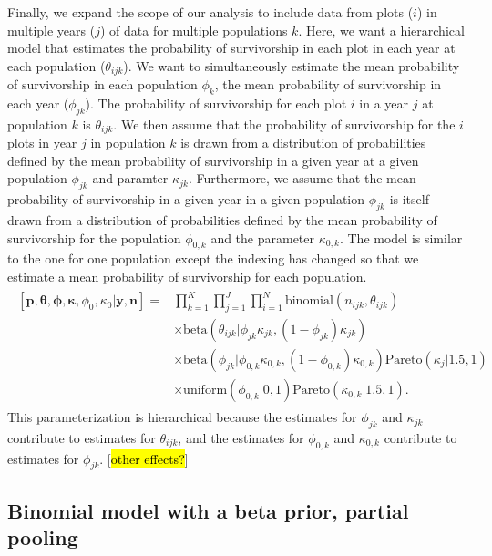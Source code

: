 \documentclass[12pt, oneside, titlepage]{article}   	%
\begin{document}
Finally, we expand the scope of our analysis to include data from plots ($i$) in multiple years ($j$) of data for multiple populations $k$. Here, we want a hierarchical model that estimates the probability of survivorship in each plot in each year at each population ($\theta_{ijk}$). We want to simultaneously estimate the mean probability of survivorship in each population $\phi_k$, the mean probability of survivorship in each year ($\phi_{jk}$). The probability of survivorship for each plot $i$ in a year $j$ at population $k$ is $\theta_{ijk}$. We then assume that the probability of survivorship for the $i$ plots in year $j$ in population $k$ is drawn from a distribution of probabilities defined by the mean probability of survivorship in a given year at a given population $\phi_{jk}$ and paramter $\kappa_{jk}$. Furthermore, we assume that the mean probability of survivorship in a given year in a given population $\phi_{jk}$ is itself drawn from a distribution of probabilities defined by the mean probability of survivorship for the population $\phi_{0,k}$ and the parameter $\kappa_{0,k}$. The model is similar to the one for one population except the indexing has changed so that we estimate a mean probability of survivorship for each population.
%
\begin{align}
  \begin{split}
[\bm{p},\bm{\theta},\bm{\phi},\bm{\kappa},\phi_0,\kappa_0|\bm{y},\bm{n}]  = & \prod_{k=1}^K\prod_{j=1}^J\prod_{i=1}^N \mathrm{binomial}(n_{ijk},\theta_{ijk}) 
    \\ & \times \mathrm{beta} (  \theta_{ijk} | \phi_{jk} \kappa_{jk} , (1-\phi_{jk}) \kappa_{jk} ) 
    \\ & \times \mathrm{beta} (  \phi_{jk} | \phi_{0,k} \kappa_{0,k} , (1- \phi_{0,k}) \kappa_{0,k} )  \mathrm{Pareto} ( \kappa_j | 1.5, 1 ) 
    \\ & \times \mathrm{uniform} ( \phi_{0,k} | 0 , 1) \mathrm{Pareto} ( \kappa_{0,k} | 1.5, 1 ). 
  \end{split}
\end{align}
%
This parameterization is hierarchical because the estimates for $\phi_{jk}$ and $\kappa_{jk}$ contribute to estimates for $\theta_{ijk}$, and the estimates for $\phi_{0,k} $ and $\kappa_{0,k} $ contribute to estimates for $\phi_{jk}$. [\hl{other effects?}]

\iffalse
\subsection*{Binomial model with a beta prior, partial pooling}
\end{document}
